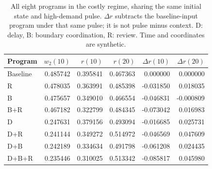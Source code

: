 \begin{table}[htbp]\centering\footnotesize
\begin{tabular}{@{}lrrrrr@{}}\toprule
Program & $w_2(10)$ & $r(10)$ & $r(20)$ & $\Delta r(10)$ & $\Delta r(20)$ \\\midrule
Baseline & 0.485742 & 0.395841 & 0.467363 & 0.000000 & 0.000000 \\
R & 0.478035 & 0.363991 & 0.485398 & -0.031850 & 0.018035 \\
B & 0.475657 & 0.349010 & 0.466554 & -0.046831 & -0.000809 \\
B+R & 0.467182 & 0.322799 & 0.484345 & -0.073042 & 0.016983 \\
D & 0.247631 & 0.379156 & 0.493094 & -0.016685 & 0.025731 \\
D+R & 0.241144 & 0.349272 & 0.514972 & -0.046569 & 0.047609 \\
D+B & 0.242189 & 0.334634 & 0.491798 & -0.061208 & 0.024435 \\
D+B+R & 0.235446 & 0.310025 & 0.513342 & -0.085817 & 0.045980 \\
\bottomrule\end{tabular}
\caption{All eight programs in the costly regime, sharing the same initial state and high-demand pulse. $\Delta r$ subtracts the baseline-input program under that same pulse; it is not pulse minus context. D: delay, B: boundary coordination, R: review. Time and coordinates are synthetic.}\label{tab:input-factorial}\end{table}
